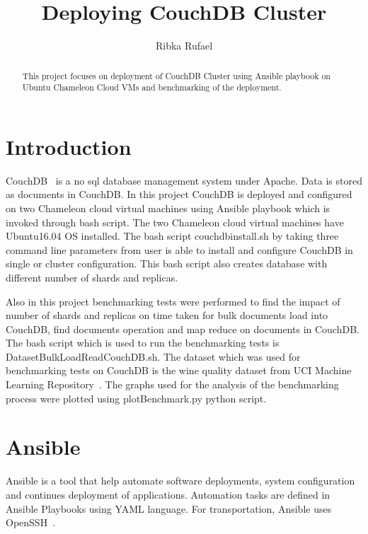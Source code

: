 \title{Deploying CouchDB Cluster}


\author{Ribka Rufael}
\orcid{}



\renewcommand{\shortauthors}{R. Rufael}


\begin{abstract}
  This project focuses on deployment of CouchDB Cluster using Ansible
  playbook on Ubuntu Chameleon Cloud VMs and benchmarking of the
  deployment.
\end{abstract}



\maketitle

\section{Introduction}

CouchDB~\cite{www-Couchdb} is a no sql database management system
under Apache. Data is stored as documents in CouchDB. In this project
CouchDB is deployed and configured on two Chameleon cloud virtual machines using
Ansible playbook which is invoked through bash script. The two Chameleon
cloud virtual machines have Ubuntu16.04 OS installed. The bash script
couchdbinstall.sh by taking three command line parameters from user is
able to install and configure CouchDB in single or cluster
configuration.  This bash script also creates database with different
number of shards and replicas. 

Also in this project benchmarking tests were performed to find the
impact of number of shards and replicas on time taken for bulk
documents load into CouchDB, find documents operation and map reduce
on documents in CouchDB. The bash script which is used to run the
benchmarking tests is DatasetBulkLoadReadCouchDB.sh.  The dataset which
was used for benchmarking tests on CouchDB is the wine quality dataset
from UCI Machine Learning Repository~\cite{www-WineQuality}. The
graphs used for the analysis of the benchmarking process were plotted
using plotBenchmark.py python script. 

\section{Ansible}
Ansible is a tool that help automate software deployments, system
configuration and continues deployment of applications. Automation
tasks are defined in Ansible Playbooks using YAML language. For
transportation, Ansible uses OpenSSH~\cite{www-Ansible}. 

